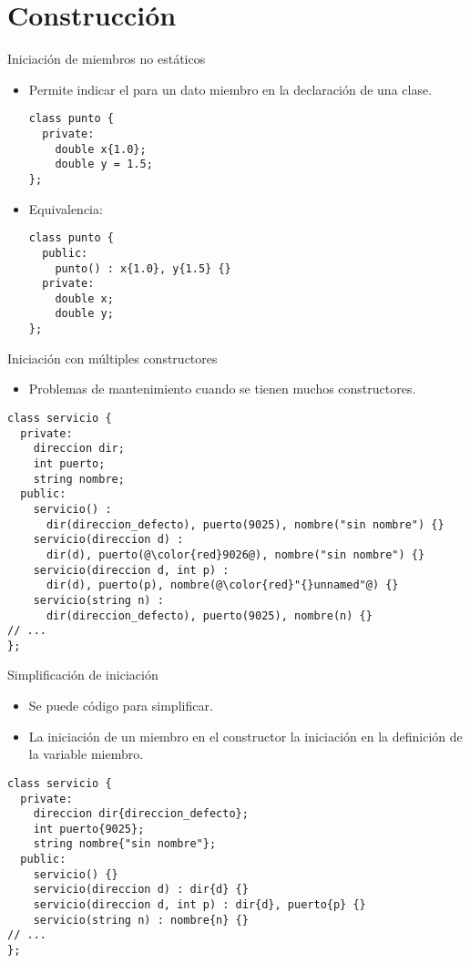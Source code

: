 \section{Construcción}

\begin{frame}[t,fragile]{Iniciación de miembros no estáticos}
\begin{itemize}
  \item Permite indicar el  para un dato miembro 
        en la declaración de una clase.
\begin{lstlisting}
class punto {
  private:
    double x{1.0};
    double y = 1.5;
};
\end{lstlisting}

  \item Equivalencia:
\begin{lstlisting}
class punto {
  public:
    punto() : x{1.0}, y{1.5} {}
  private:
    double x;
    double y;
};
\end{lstlisting}
\end{itemize}
\end{frame}

\begin{frame}[t,fragile]{Iniciación con múltiples constructores}
\begin{itemize}
  \item Problemas de mantenimiento cuando se tienen muchos constructores.
\end{itemize}
\begin{lstlisting}[escapechar=@]
class servicio {
  private:
    direccion dir;
    int puerto;
    string nombre;
  public:
    servicio() :
      dir(direccion_defecto), puerto(9025), nombre("sin nombre") {}
    servicio(direccion d) :
      dir(d), puerto(@\color{red}9026@), nombre("sin nombre") {}
    servicio(direccion d, int p) :
      dir(d), puerto(p), nombre(@\color{red}"{}unnamed"@) {}
    servicio(string n) :
      dir(direccion_defecto), puerto(9025), nombre(n) {}
// ...
};
\end{lstlisting}
\end{frame}

\begin{frame}[t,fragile]{Simplificación de iniciación}
\begin{itemize}
  \item Se puede  código para simplificar.
  \item La iniciación de un miembro en el constructor 
         la iniciación en la definición de la variable miembro.
\end{itemize}
\begin{lstlisting}
class servicio {
  private:
    direccion dir{direccion_defecto};
    int puerto{9025};
    string nombre{"sin nombre"};
  public:
    servicio() {}
    servicio(direccion d) : dir{d} {}
    servicio(direccion d, int p) : dir{d}, puerto{p} {}
    servicio(string n) : nombre{n} {}
// ...
};
\end{lstlisting}
\end{frame}

